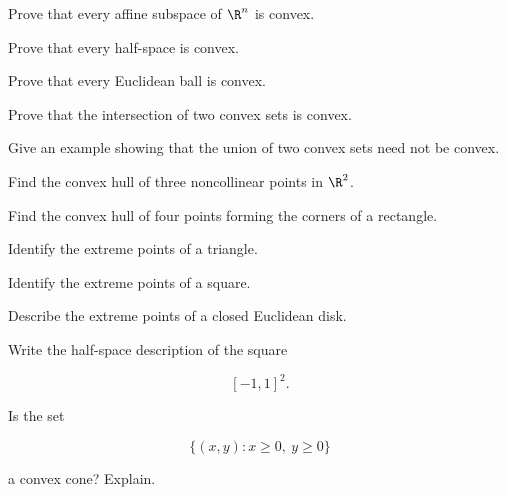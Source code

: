 \begin{exercise}[2]
Prove that every affine subspace of \(\R^n\) is convex.
\end{exercise}

\begin{exercise}[2]
Prove that every half-space is convex.
\end{exercise}

\begin{exercise}[2]
Prove that every Euclidean ball is convex.
\end{exercise}

\begin{exercise}[2]
Prove that the intersection of two convex sets is convex.
\end{exercise}

\begin{exercise}[2]
Give an example showing that the union of two convex sets need not be
convex.
\end{exercise}

\begin{exercise}[2]
Find the convex hull of three noncollinear points in \(\R^2\).
\end{exercise}

\begin{exercise}[2]
Find the convex hull of four points forming the corners of a rectangle.
\end{exercise}

\begin{exercise}[2]
Identify the extreme points of a triangle.
\end{exercise}

\begin{exercise}[2]
Identify the extreme points of a square.
\end{exercise}

\begin{exercise}[2]
Describe the extreme points of a closed Euclidean disk.
\end{exercise}

\begin{exercise}[2]
Write the half-space description of the square

\[
[-1,1]^2.
\]
\end{exercise}

\begin{exercise}[2]
Is the set

\[
\{(x,y):x\geq0,\ y\geq0\}
\]

a convex cone? Explain.
\end{exercise}

